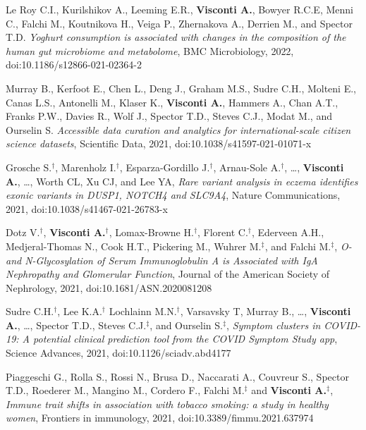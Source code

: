 {\begin{itemize}
	   Le Roy C.I., Kurilshikov A., Leeming E.R., \textbf{Visconti A.}, Bowyer R.C.E, Menni C., Falchi M., Koutnikova H., Veiga P., Zhernakova A., Derrien M., and Spector T.D. \emph{Yoghurt consumption is associated with changes in the composition of the human gut microbiome and metabolome}, BMC Microbiology, 2022, doi:10.1186/s12866-021-02364-2	
		
		 Murray B., Kerfoot E., Chen L., Deng J., Graham M.S., Sudre C.H., Molteni E., Canas L.S., Antonelli M., Klaser K., \textbf{Visconti A.}, Hammers A., Chan A.T., Franks P.W., Davies R., Wolf J., Spector T.D., Steves C.J., Modat M., and Ourselin S. \emph{Accessible data curation and analytics for international-scale citizen science datasets}, Scientific Data, 2021, doi:10.1038/s41597-021-01071-x

	    Grosche S.$^{\textbf{$\dag $}}$, Marenholz I.$^{\textbf{$\dag $}}$, Esparza-Gordillo J.$^{\textbf{$\dag $}}$, Arnau-Sole A.$^{\textbf{$\dag $}}$, \dots, \textbf{Visconti A.}, \dots, Worth CL, Xu CJ, and Lee YA, \emph{Rare variant analysis in eczema identifies exonic variants in DUSP1, NOTCH4 and SLC9A4}, Nature Communications, 2021, doi:10.1038/s41467-021-26783-x

	    Dotz V.$^{\textbf{$\dag $}}$, \textbf{Visconti A.}$^{\textbf{$\dag $}}$, Lomax-Browne H.$^{\textbf{$\dag $}}$, Florent C.$^{\textbf{$\dag $}}$, Ederveen A.H., Medjeral-Thomas N., Cook H.T., Pickering M.,  Wuhrer M.$^{\textbf{$\ddag $}}$, and Falchi M.$^{\textbf{$\ddag $}}$, \emph{O- and N-Glycosylation of Serum Immunoglobulin A is Associated with IgA Nephropathy and Glomerular Function}, Journal of the American Society of Nephrology, 2021, doi:10.1681/ASN.2020081208

		 Sudre C.H.$^{\textbf{$\dag $}}$, Lee K.A.$^{\textbf{$\dag $}}$ Lochlainn M.N.$^{\textbf{$\dag $}}$, Varsavsky T, Murray B., \dots, \textbf{Visconti A.}, \dots, Spector T.D., Steves C.J.$^{\textbf{$\ddag $}}$, and Ourselin S.$^{\textbf{$\ddag $}}$, \emph{Symptom clusters in COVID-19: A potential clinical prediction tool from the COVID Symptom Study app}, Science Advances, 2021, doi:10.1126/sciadv.abd4177
				
		  Piaggeschi G., Rolla S., Rossi N., Brusa D., Naccarati A., Couvreur S., Spector T.D., Roederer M., Mangino M., Cordero F., Falchi M.$^{\textbf{$\ddag $}}$ and \textbf{Visconti A.}$^{\textbf{$\ddag $}}$, \emph{Immune trait shifts in association with tobacco smoking: a study in healthy women}, Frontiers in immunology, 2021, doi:10.3389/fimmu.2021.637974
		

\end{itemize}}
